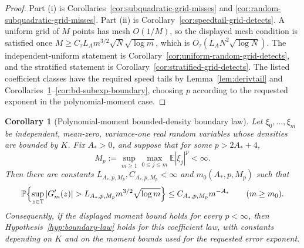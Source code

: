 \documentclass[11pt]{amsart}
\numberwithin{equation}{section}
\newtheorem{corollary}[theorem]{Corollary}
\theoremstyle{definition}
\theoremstyle{remark}
\newcommand{\T}{\mathbb T}
\newcommand{\Prob}{\mathbb P}
\newcommand{\Exp}{\mathbb E}
\newcommand{\abs}[1]{\left\lvert #1\right\rvert}
\begin{document}
\begin{proof}
Part (i) is Corollaries~\ref{cor:subquadratic-grid-misses} and
\ref{cor:random-subquadratic-grid-misses}.  Part (ii) is
Corollary~\ref{cor:speedtail-grid-detects}.  A uniform grid of
\(M\) points has mesh \(O(1/M)\), so the displayed mesh condition is satisfied
once \(M\ge C_\tau L_A m^{3/2}\sqrt N\sqrt{\log m}\), which is
\(O_\tau(L_A N^2\sqrt{\log N})\).  The independent-uniform statement is
Corollary~\ref{cor:uniform-random-grid-detects}, and the stratified statement
is Corollary~\ref{cor:stratified-grid-detects}.  The listed coefficient classes have the
required speed tails by Lemma~\ref{lem:derivtail} and
Corollaries~\ref{cor:bd-polymoment-boundary}--\ref{cor:bd-subexp-boundary},
choosing \(p\) according to the requested exponent in the polynomial-moment
case.
\end{proof}

\begin{corollary}[Polynomial-moment bounded-density boundary law]
\label{cor:bd-polymoment-boundary}
Let \(\xi_0,\ldots,\xi_m\) be independent, mean-zero, variance-one real random
variables whose densities are bounded by \(K\).  Fix \(A_\ast>0\), and suppose
that for some \(p>2A_\ast+4\),
\[
  M_p:=\sup_{m\ge1}\max_{0\le j\le m}\Exp\abs{\xi_j}^{p}<\infty .
\]
Then there are constants \(L_{A_\ast,p,M_p},C_{A_\ast,p,M_p}<\infty\) and
\(m_0(A_\ast,p,M_p)\) such that
\[
  \Prob\Bigl\{\sup_{z\in\T}\abs{G_m'(z)}
      > L_{A_\ast,p,M_p}m^{3/2}\sqrt{\log m}\Bigr\}
  \le C_{A_\ast,p,M_p}m^{-A_\ast}
  \qquad(m\ge m_0).
\]
Consequently, if the displayed moment bound holds for every \(p<\infty\), then
Hypothesis~\ref{hyp:boundary-law} holds for this coefficient law, with
constants depending on \(K\) and on the moment bounds used for the requested
error exponent.
\end{corollary}
\end{document}
